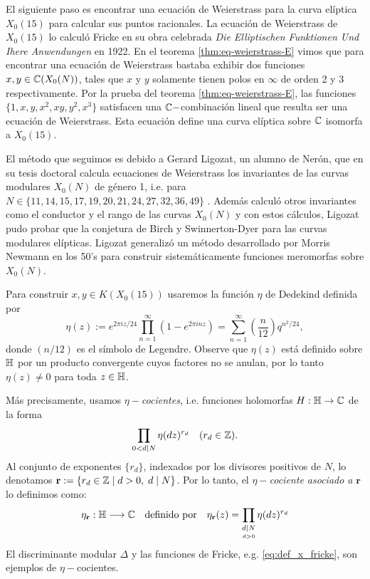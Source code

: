\documentclass[../../tesis_maestria]{subfiles}
\begin{document}
El siguiente paso es encontrar una ecuación de Weierstrass para la curva elíptica $X_0(15)$ para calcular sus puntos racionales. La ecuación de Weierstrass de $X_0(15)$ lo calculó Fricke en su obra celebrada \emph{Die Elliptischen Funktionen Und Ihere Anwendungen} en 1922. En el teorema \ref{thm:eq-weierstrass-E} vimos que para encontrar una ecuación de Weierstrass bastaba exhibir dos funciones $x,y\in\mathbb{C}(X_0(N))$, tales que $x$ y $y$ solamente tienen polos en $\infty$ de orden 2 y 3 respectivamente. Por la prueba del teorema \ref{thm:eq-weierstrass-E}, las funciones $\{1,x,y,x^2,xy,y^2,x^3\}$ satisfacen una $\mathbb{C}-$combinación lineal que resulta ser una ecuación de Weierstrass. Esta ecuación define una curva elíptica sobre $\mathbb{C}$ isomorfa a $X_0(15)$.

El método que seguimos es debido a Gerard Ligozat, un alumno de Nerón, que en su tesis doctoral calcula ecuaciones de Weierstrass los invariantes de las curvas modulares $X_0(N)$ de género 1, i.e. para $N\in\{11,14,15,17,19,20,21,24,27,32,36,49\}$ \cite{LigozatCMDG1}. Además calculó otros invariantes como el conductor y el rango de las curvas $X_0(N)$ y con estos cálculos, Ligozat pudo probar que la conjetura de Birch y Swinnerton-Dyer para las curvas modulares elípticas. Ligozat generalizó un método desarrollado por Morris Newmann en los 50's para construir sistemáticamente funciones meromorfas sobre $X_0(N)$.

Para construir $x,y\in K(X_0(15))$ usaremos la función $\eta$ de Dedekind definida por
\begin{equation}\label{defin:eta}
	\eta(z):=e^{2\pi iz/24}\prod_{n=1}^\infty(1-e^{2\pi inz})=\sum_{n=1}^{\infty} \left(\frac{n}{12}\right)q^{n^2/24},
\end{equation}
donde $(n/12)$ es el símbolo de Legendre. Observe que $\eta(z)$ está definido sobre $\mathbb{H}$ por un producto convergente cuyos factores no se anulan, por lo tanto $\eta(z)\neq0$ para toda $z\in\mathbb{H}$.

Más precisamente, usamos $\eta-$\emph{cocientes}, i.e. funciones holomorfas $H:\mathbb{H}\rightarrow\mathbb{C}$ de la forma
\[
	\prod_{0<d\mid N}\eta(dz)^{r_d} \quad (r_d\in\mathbb{Z}).
\]
Al conjunto de exponentes $\{r_d\}$, indexados por los divisores positivos de $N$, lo denotamos $\mathbf{r}:=\{r_d\in\mathbb{Z}\mid d>0,\; d\mid N\}$. Por lo tanto, el $\eta-$\emph{cociente asociado a} $\mathbf{r}$ lo definimos como:
\[
	\eta_{\mathbf{r}}:\mathbb{H}\longrightarrow\mathbb{C}\quad\text{definido por}\quad
	\eta_{\mathbf{r}}(z)=\prod_{\underset{d>0}{d\mid N}}\eta(dz)^{r_d}
\]
El discriminante modular $\Delta$ y las funciones de Fricke, e.g.  \eqref{eq:def_x_fricke}, son ejemplos de $\eta-$cocientes.
\end{document}
